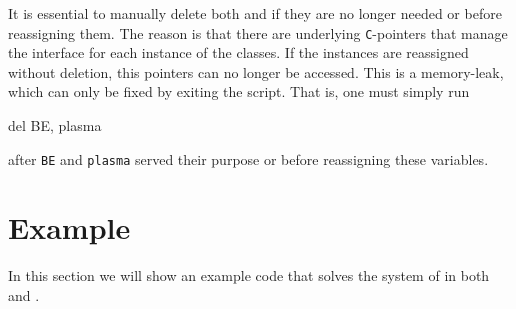 \documentclass[11pt,a4paper]{article}
\begin{document}
It is essential to manually delete both  and  if they are no longer needed or before reassigning them. The reason is that there are underlying {\tt C}-pointers that manage the \PY interface for each instance of the classes. If the instances are reassigned without deletion, this pointers can no longer be accessed. This is a memory-leak, which can only be fixed by exiting the script. 
%
That is, one must simply run 
%
\begin{py}
	del BE, plasma
\end{py}  
%
after {\tt BE} and {\tt plasma} served their purpose or before reassigning these variables.

\section{Example}\label{sec:example}
\setcounter{equation}{0}
%
In this section we will show an example code that solves the system of  in both \CPP and \PY.
%
\end{document}
